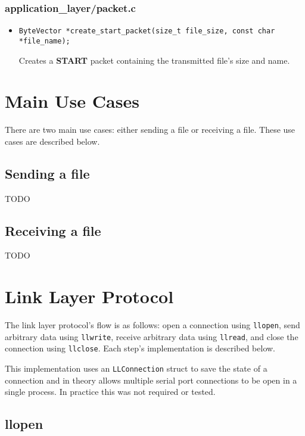 \documentclass[11pt,a4paper]{article}
\begin{document}
\subsubsection{application\_layer/packet.c}

\begin{itemize}
    \item \begin{lstlisting}
ByteVector *create_start_packet(size_t file_size, const char *file_name);
    \end{lstlisting}

    Creates a \textbf{START} packet containing the transmitted file's size and name.

\end{itemize}

\section{Main Use Cases}

There are two main use cases: either sending a file or receiving a file.
These use cases are described below.

\subsection{Sending a file}

TODO

\subsection{Receiving a file}

TODO

\section{Link Layer Protocol}

The link layer protocol's flow is as follows: open a connection using \lstinline{llopen}, send arbitrary data using \lstinline{llwrite}, receive arbitrary data using \lstinline{llread}, and close the connection using \lstinline{llclose}.
Each step's implementation is described below.

This implementation uses an \lstinline{LLConnection} struct to save the state of a connection and in theory allows multiple serial port connections to be open in a single process.
In practice this was not required or tested.

\subsection{llopen}
\end{document}
